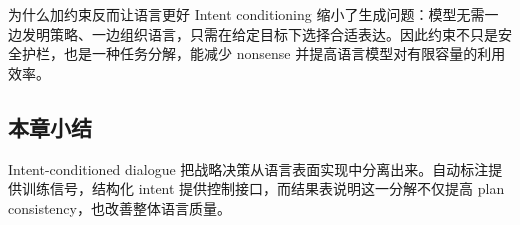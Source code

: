 \begin{importantbox}{为什么加约束反而让语言更好}
Intent conditioning 缩小了生成问题：模型无需一边发明策略、一边组织语言，只需在给定目标下选择合适表达。因此约束不只是安全护栏，也是一种任务分解，能减少 nonsense 并提高语言模型对有限容量的利用效率。
\end{importantbox}

\subsection{本章小结}

Intent-conditioned dialogue 把战略决策从语言表面实现中分离出来。自动标注提供训练信号，结构化 intent 提供控制接口，而结果表说明这一分解不仅提高 plan consistency，也改善整体语言质量。

